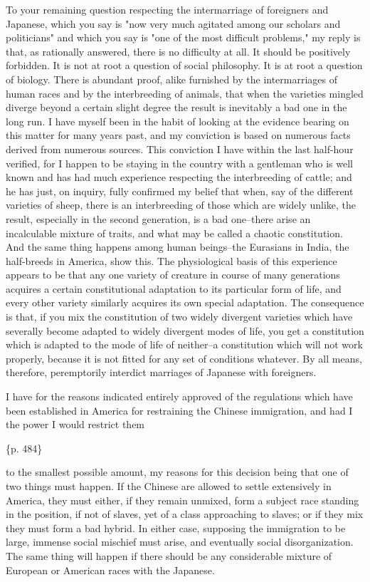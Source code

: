 To your remaining question respecting the intermarriage of foreigners and Japanese, which you say is "now very much agitated among our scholars and politicians" and which you say is "one of the most difficult problems," my reply is that, as rationally answered, there is no difficulty at all. It should be positively forbidden. It is not at root a question of social philosophy. It is at root a question of biology. There is abundant proof, alike furnished by the intermarriages of human races and by the interbreeding of animals, that when the varieties mingled diverge beyond a certain slight degree the result is inevitably a bad one in the long run. I have myself been in the habit of looking at the evidence bearing on this matter for many years past, and my conviction is based on numerous facts derived from numerous sources. This conviction I have within the last half-hour verified, for I happen to be staying in the country with a gentleman who is well known and has had much experience respecting the interbreeding of cattle; and he has just, on inquiry, fully confirmed my belief that when, say of the different varieties of sheep, there is an interbreeding of those which are widely unlike, the result, especially in the second generation, is a bad one--there arise an incalculable mixture of traits, and what may be called a chaotic constitution. And the same thing happens among human beings--the Eurasians in India, the half-breeds in America, show this. The physiological basis of this experience appears to be that any one variety of creature in course of many generations acquires a certain constitutional adaptation to its particular form of life, and every other variety similarly acquires its own special adaptation. The consequence is that, if you mix the constitution of two widely divergent varieties which have severally become adapted to widely divergent modes of life, you get a constitution which is adapted to the mode of life of neither--a constitution which will not work properly, because it is not fitted for any set of conditions whatever. By all means, therefore, peremptorily interdict marriages of Japanese with foreigners.

I have for the reasons indicated entirely approved of the regulations which have been established in America for restraining the Chinese immigration, and had I the power I would restrict them

\{p. 484\}

to the smallest possible amount, my reasons for this decision being that one of two things must happen. If the Chinese are allowed to settle extensively in America, they must either, if they remain unmixed, form a subject race standing in the position, if not of slaves, yet of a class approaching to slaves; or if they mix they must form a bad hybrid. In either case, supposing the immigration to be large, immense social mischief must arise, and eventually social disorganization. The same thing will happen if there should be any considerable mixture of European or American races with the Japanese.

